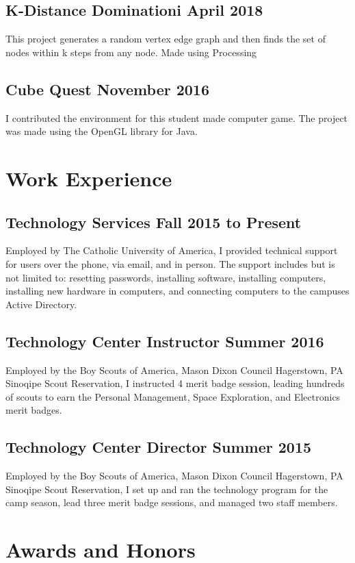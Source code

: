 \documentclass{article}
\begin{document}
\subsection{K-Distance Dominationi \hfill April 2018}
This project generates a random vertex edge graph and then finds the set of nodes within k steps from any node.
Made using Processing

\subsection{Cube Quest \hfill November 2016}
I contributed the environment for this student made computer game.
The project was made using the OpenGL library for Java.


\section{Work Experience}
\subsection{Technology Services \hfill Fall 2015 to Present}
Employed by The Catholic University of America,
I provided technical support for users over the phone, via email, and in person.
The support includes but is not limited to:
resetting passwords,
installing software,
installing computers,
installing new hardware in computers,
and
connecting computers to the campuses Active Directory.

\subsection{Technology Center Instructor \hfill Summer 2016}
Employed by the Boy Scouts of America, Mason Dixon Council Hagerstown, PA Sinoqipe Scout Reservation,
I instructed 4 merit badge session, leading hundreds of scouts to earn the
Personal Management,
Space Exploration,
and
Electronics
merit badges.
\subsection{Technology Center Director \hfill Summer 2015}
Employed by the Boy Scouts of America, Mason Dixon Council Hagerstown, PA Sinoqipe Scout Reservation,
I set up and ran the technology program for the camp season,
lead three merit badge sessions,
and managed two staff members.
\section{Awards and Honors}
\end{document}
